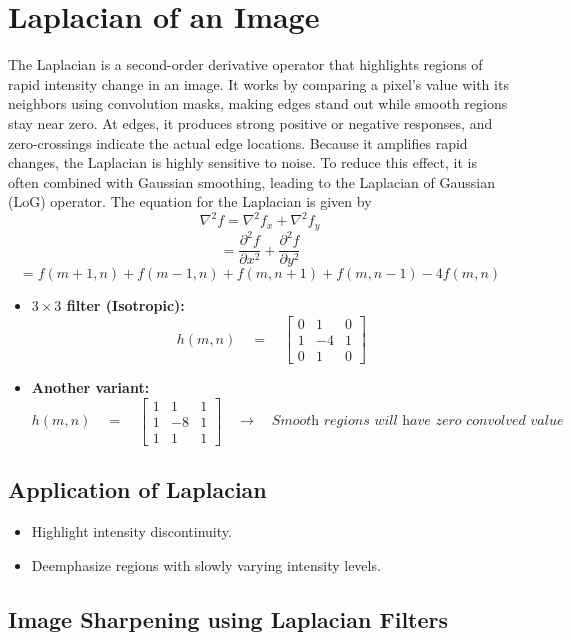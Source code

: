 \documentclass[12 pt]{article}        	%
\begin{document}
\section{Laplacian of an Image}
The Laplacian is a second-order derivative operator that highlights regions of rapid intensity change in an image.
It works by comparing a pixel’s value with its neighbors using convolution masks, making edges stand out while smooth regions stay near zero.
At edges, it produces strong positive or negative responses, and zero-crossings indicate the actual edge locations.
Because it amplifies rapid changes, the Laplacian is highly sensitive to noise.
To reduce this effect, it is often combined with Gaussian smoothing, leading to the Laplacian of Gaussian (LoG) operator. The equation for the Laplacian is given by
\[\nabla^2 f = \nabla^2 f_x + \nabla^2 f_y\]
\[
= \frac{\partial^2 f}{\partial x^2} + \frac{\partial^2 f}{\partial y^2}
\]
\[
= f(m+1,n) + f(m-1,n) + f(m,n+1) + f(m,n-1) - 4f(m,n)
\]
\begin{itemize}
    \item \textbf{$3 \times 3$ filter (Isotropic):}
\[
h(m,n) \quad=\quad 
\begin{bmatrix}
0 & 1 & 0 \\
1 & -4 & 1 \\
0 & 1 & 0
\end{bmatrix}
\]
\item \textbf{Another variant:}
\[
h(m,n) \quad=\quad
\begin{bmatrix}
1 & 1 & 1 \\
1 & -8 & 1 \\
1 & 1 & 1
\end{bmatrix}
\quad\rightarrow\quad \textit{Smooth regions will have zero convolved value}
\]
\end{itemize}
\subsection*{Application of Laplacian}
\begin{itemize}
    \item Highlight intensity discontinuity.
    \item Deemphasize regions with slowly varying intensity levels. 
\end{itemize}
\subsection*{Image Sharpening using Laplacian Filters}
\vspace{2pt}
\end{document}
